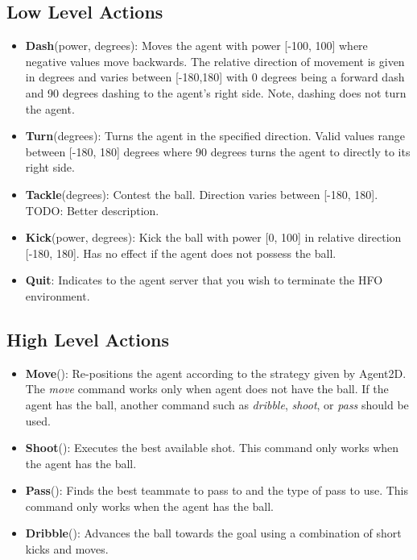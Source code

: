 \documentclass[12pt]{article}
\begin{document}
\subsection{Low Level Actions}
\begin{itemize}
\item{\textbf{Dash}(power, degrees): Moves the agent with power [-100,
    100] where negative values move backwards. The relative direction
  of movement is given in degrees and varies between [-180,180] with 0
  degrees being a forward dash and 90 degrees dashing to the agent's
  right side. Note, dashing does not turn the agent.}
\item{\textbf{Turn}(degrees): Turns the agent in the
  specified direction. Valid values range between [-180, 180] degrees
  where 90 degrees turns the agent to directly to its right side.}
\item{\textbf{Tackle}(degrees): Contest the ball. Direction
  varies between [-180, 180]. TODO: Better description.}
\item{\textbf{Kick}(power, degrees): Kick the ball with power [0, 100]
  in relative direction [-180, 180]. Has no effect if the agent does
  not possess the ball.}
\item{\textbf{Quit}: Indicates to the agent server that you wish to
  terminate the HFO environment.}
\end{itemize}

\subsection{High Level Actions}
\begin{itemize}
\item{\textbf{Move}(): Re-positions the agent according to the
  strategy given by Agent2D. The \textit{move} command works only when
  agent does not have the ball. If the agent has the ball, another
  command such as \textit{dribble}, \textit{shoot}, or \textit{pass}
  should be used.}
\item{\textbf{Shoot}(): Executes the best available shot. This command
  only works when the agent has the ball.}
\item{\textbf{Pass}(): Finds the best teammate to pass to and the type
  of pass to use. This command only works when the agent has the
  ball.}
\item{\textbf{Dribble}(): Advances the ball towards the goal using a
  combination of short kicks and moves.}
\end{itemize}



\end{document}
